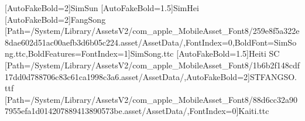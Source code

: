 \setmainfont{Times New Roman}
\newcommand\whcbodybaseline{19.95bp}
\newcommand\whcreferencebaseline{14.2bp}
\newcommand\whcdeclarationbaseline{27.75bp}
\newcommand\whccoverbaseline{27.75bp}
\ifwhcstrictfonts
 [AutoFakeBold=2]{SimSun}
 [AutoFakeBold=1.5]{SimHei}
 [AutoFakeBold=2]{FangSong}
\else
 [Path=/System/Library/AssetsV2/com_apple_MobileAsset_Font8/259e8f5a322e8dae602d51ac00aefb3d6b05c224.asset/AssetData/,FontIndex=0,BoldFont=SimSong.ttc,BoldFeatures={FontIndex=1}]{SimSong.ttc}
 [AutoFakeBold=1.5]{Heiti SC}
 [Path=/System/Library/AssetsV2/com_apple_MobileAsset_Font8/1b6b2f148cdf17dd0d788706c83c61ca1998c3a6.asset/AssetData/,AutoFakeBold=2]{STFANGSO.ttf}
 [Path=/System/Library/AssetsV2/com_apple_MobileAsset_Font8/88d6cc32a907955efa1d014207889413890573be.asset/AssetData/,FontIndex=0]{Kaiti.ttc}
\fi
\providecommand\songti{\CJKfamily{zhsong}}
\providecommand\heiti{\CJKfamily{zhhei}}
\providecommand\fangsong{\CJKfamily{zhfs}}
\providecommand\kaishu{\CJKfamily{zhkai}}

